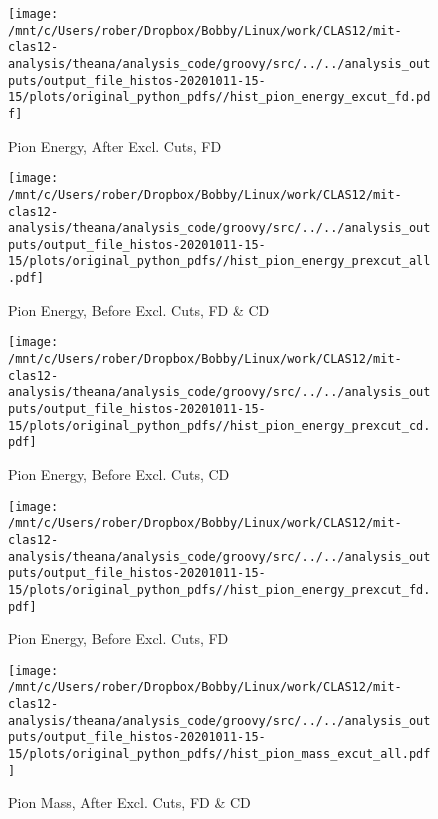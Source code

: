 \documentclass{article}
\begin{document}
\begin{landscape}
    \begin{figure}[h]
        \centering

        \texttt{[image: /mnt/c/Users/rober/Dropbox/Bobby/Linux/work/CLAS12/mit-clas12-analysis/theana/analysis\_code/groovy/src/../../analysis\_outputs/output\_file\_histos-20201011-15-15/plots/original\_python\_pdfs//hist\_pion\_energy\_excut\_fd.pdf]}
        \captionsetup{textformat=empty,labelformat=blank}
        \caption{Pion Energy, After Excl. Cuts, FD}
    \end{figure}
    \clearpage
    
    \begin{figure}[h]
        \centering

        \texttt{[image: /mnt/c/Users/rober/Dropbox/Bobby/Linux/work/CLAS12/mit-clas12-analysis/theana/analysis\_code/groovy/src/../../analysis\_outputs/output\_file\_histos-20201011-15-15/plots/original\_python\_pdfs//hist\_pion\_energy\_prexcut\_all.pdf]}
        \captionsetup{textformat=empty,labelformat=blank}
        \caption{Pion Energy, Before Excl. Cuts, FD \& CD}
    \end{figure}
    \clearpage
    
    \begin{figure}[h]
        \centering

        \texttt{[image: /mnt/c/Users/rober/Dropbox/Bobby/Linux/work/CLAS12/mit-clas12-analysis/theana/analysis\_code/groovy/src/../../analysis\_outputs/output\_file\_histos-20201011-15-15/plots/original\_python\_pdfs//hist\_pion\_energy\_prexcut\_cd.pdf]}
        \captionsetup{textformat=empty,labelformat=blank}
        \caption{Pion Energy, Before Excl. Cuts, CD}
    \end{figure}
    \clearpage
    
    \begin{figure}[h]
        \centering

        \texttt{[image: /mnt/c/Users/rober/Dropbox/Bobby/Linux/work/CLAS12/mit-clas12-analysis/theana/analysis\_code/groovy/src/../../analysis\_outputs/output\_file\_histos-20201011-15-15/plots/original\_python\_pdfs//hist\_pion\_energy\_prexcut\_fd.pdf]}
        \captionsetup{textformat=empty,labelformat=blank}
        \caption{Pion Energy, Before Excl. Cuts, FD}
    \end{figure}
    \clearpage
    
    \begin{figure}[h]
        \centering

        \texttt{[image: /mnt/c/Users/rober/Dropbox/Bobby/Linux/work/CLAS12/mit-clas12-analysis/theana/analysis\_code/groovy/src/../../analysis\_outputs/output\_file\_histos-20201011-15-15/plots/original\_python\_pdfs//hist\_pion\_mass\_excut\_all.pdf]}
        \captionsetup{textformat=empty,labelformat=blank}
        \caption{Pion Mass, After Excl. Cuts, FD \& CD}
    \end{figure}
    \clearpage
    

\end{landscape}
\end{document}
